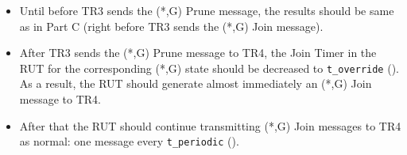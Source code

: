 \documentclass[11pt]{report}
\begin{document}

\begin{itemize}

  \item Until before TR3 sends the (*,G) Prune message, the results should
  be same as in Part C (right before TR3 sends the (*,G) Join message).

  \item After TR3 sends the (*,G) Prune message to TR4,
  the Join Timer in the RUT for the corresponding (*,G) state
  should be decreased to \verb=t_override= ({\PimsmTOverride}). As a result,
  the RUT should generate almost immediately an (*,G) Join message to TR4.

  \item After that the RUT should continue transmitting 
  (*,G) Join messages to TR4 as normal: one message every \verb=t_periodic=
  ({\PimsmTPeriodic}).

\end{itemize}

\end{document}
